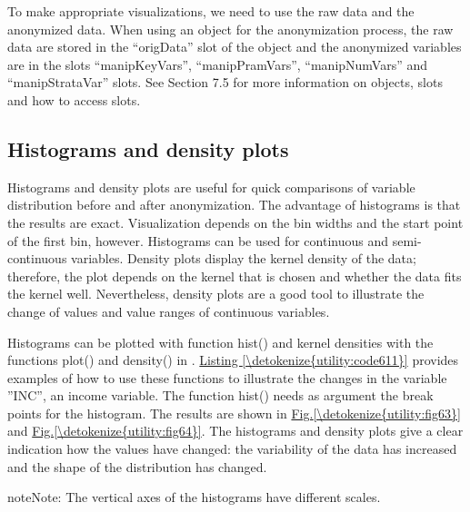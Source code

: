 \documentclass[letterpaper,10pt,english]{sphinxmanual}
\begin{document}
To make appropriate visualizations, we need to use the raw data and the
anonymized data. When using an  object for the anonymization
process, the raw data are stored in the “origData” slot of the object
and the anonymized variables are in the slots “manipKeyVars”,
“manipPramVars”, “manipNumVars” and “manipStrataVar” slots. See Section
7.5 for more information on  objects, slots and how to access
slots.


\subsection{Histograms and density plots}
\label{\detokenize{utility:histograms-and-density-plots}}
Histograms and density plots are useful for quick comparisons of
variable distribution before and after anonymization. The advantage of
histograms is that the results are exact. Visualization depends on the
bin widths and the start point of the first bin, however. Histograms can
be used for continuous and semi-continuous variables. Density plots
display the kernel density of the data; therefore, the plot depends on
the kernel that is chosen and whether the data fits the kernel well.
Nevertheless, density plots are a good tool to illustrate the change of
values and value ranges of continuous variables.

Histograms can be plotted with function hist() and kernel densities with
the functions plot() and density() in . \hyperref[\detokenize{utility:code611}]{Listing \ref{\detokenize{utility:code611}}} provides
examples of how to use these functions to illustrate the changes in the
variable ”INC”, an income variable. The function hist() needs as
argument the break points for the histogram. The results are shown in
\hyperref[\detokenize{utility:fig63}]{Fig.\@ \ref{\detokenize{utility:fig63}}} and \hyperref[\detokenize{utility:fig64}]{Fig.\@ \ref{\detokenize{utility:fig64}}}. The histograms and density plots give a clear
indication how the values have changed: the variability of the data has
increased and the shape of the distribution has changed.

\begin{sphinxadmonition}{note}{Note:}
The vertical axes of the histograms have different scales.
\end{sphinxadmonition}
\end{document}
